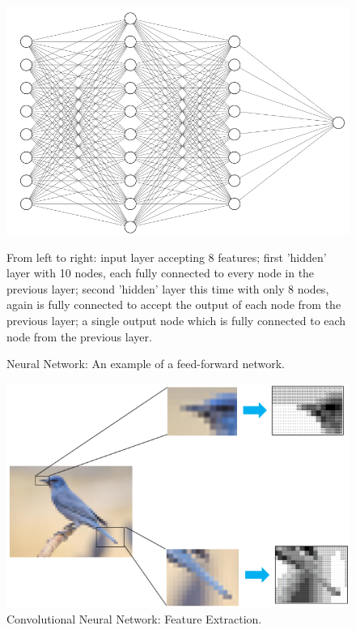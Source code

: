 \begin{figure}[p]
	\centering
	\includegraphics[scale=0.6]{Figures/nn.png}
	\caption{Neural Network: An example of a feed-forward network.} {From left to right: input layer accepting 8 features; first 'hidden' layer with 10 nodes, each fully connected to every node in the previous layer; second 'hidden' layer this time with only 8 nodes, again is fully connected to accept the output of each node from the previous layer; a single output node which is fully connected to each node from the previous layer.}
	\label{fig:neural_network}
\end{figure}

\begin{figure}[p]
	\centering
	\includegraphics[scale=0.75]{Figures/cnn_feature.png}
	\caption{Convolutional Neural Network: Feature Extraction.}
	\label{fig:cnn_feature}
\end{figure}

